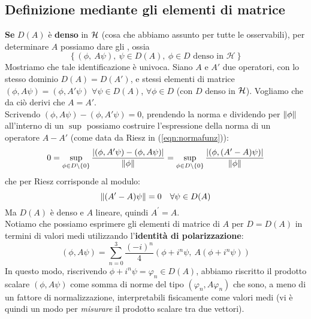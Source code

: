\documentclass[FisicaTeorica.tex]{subfiles}
\begin{document}
\subsection{Definizione mediante gli elementi di matrice}
\textbf{Se} $D(A)$ è \textbf{denso} in $\mathcal{H}$ (cosa che abbiamo assunto per tutte le osservabili), per determinare $A$ possiamo dare gli , ossia 
\[
\left\{\left(\phi,\ A\psi\right),\ \psi\in D\left(A\right),\ \phi\in D\text{\ denso\ in\ }\mathcal{H}\right\}
\]
Mostriamo che tale identificazione è univoca. Siano $A$ e $A'$ due operatori, con lo stesso dominio $D(A) = D(A')$, e stessi elementi di matrice $(\phi, A\psi) = (\phi, A'\psi)$ $\forall \psi \in D(A)$, $\forall \phi \in D$ (con $D$ denso in $\mathcal{H}$). Vogliamo che da ciò derivi che $A = A'$.\\
Scrivendo $(\phi, A\psi)-(\phi, A'\psi) = 0$, prendendo la norma e dividendo per $\left\lVert\phi\right\rVert$ all'interno di un $\sup$ possiamo costruire l'espressione della norma di un operatore $A-A'$ (come data da Riesz in (\ref{eqn:normafunz})): 
\[ 0 = \sup_{\phi \in D\setminus \{0\}}\frac{|(\phi, A'\psi)-(\phi, A\psi)|}{\left\lVert\phi\right\rVert} = \sup_{\phi\in D\setminus\{0\}} \frac{|(\phi, (A'-A)\psi)|}{\left\lVert\phi\right\rVert}
\]
che per Riesz corrisponde al modulo: %
\[
\left\lVert(A'-A)\psi\right\rVert = 0 \quad \forall \psi \in D(A)
\] 
	Ma $D(A)$ è denso e $A$ lineare, quindi $A^\prime=A$.\\
	Notiamo che possiamo esprimere gli elementi di matrice di $A$ per $D=D(A)$ in termini di valori medi utilizzando l'\textbf{identità di polarizzazione}:
	\[
	\left(\phi, A\psi\right)= \sum_{n=0}^{3}{\frac{\left(-i\right)^n}{4}(\phi+i^n\psi,\ A\left(\phi+i^n\psi\right))}
	\]
	In questo modo, riscrivendo $\phi + i^n\psi = \varphi_n \in D(A)$, abbiamo riscritto il prodotto scalare $(\phi, A\psi)$ come somma di norme del tipo $(\varphi_n, A\varphi_n)$ che sono, a meno di un fattore di normalizzazione, interpretabili fisicamente come valori medi (vi è quindi un modo per \textit{misurare} il prodotto scalare tra due vettori).
\end{document}
